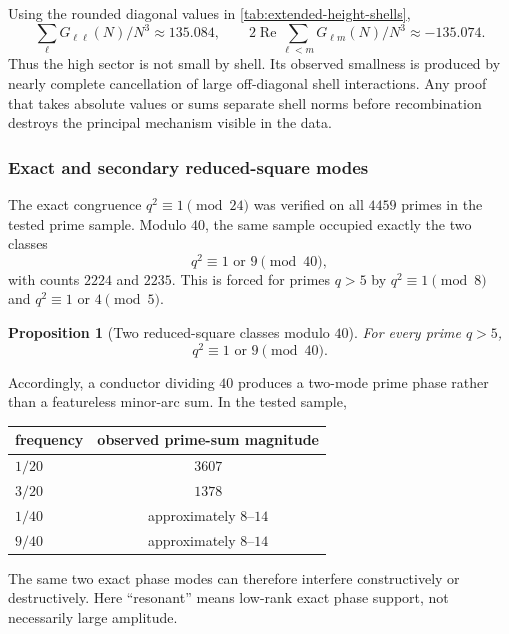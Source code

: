 \documentclass[11pt]{article}
\newtheorem{proposition}[theorem]{Proposition}
\theoremstyle{definition}
\newcommand{\1}{\mathbf{1}}
\newcommand{\Repart}{\operatorname{Re}}
\begin{document}
Using the rounded diagonal values in \cref{tab:extended-height-shells},
\begin{equation}
 \sum_\ell G_{\ell\ell}(N)/N^3\approx135.084,
 \qquad
 2\Repart\sum_{\ell<m}G_{\ell m}(N)/N^3\approx-135.074.
 \label{eq:extended-cross-shell-cancellation}
\end{equation}
Thus the high sector is not small by shell.  Its observed smallness is produced by nearly complete cancellation of large off-diagonal shell interactions.  Any proof that takes absolute values or sums separate shell norms before recombination destroys the principal mechanism visible in the data.

\subsubsection{Exact and secondary reduced-square modes}

The exact congruence $q^2\equiv1\pmod{24}$ was verified on all $4459$ primes in the tested prime sample.  Modulo $40$, the same sample occupied exactly the two classes
\begin{equation}
 q^2\equiv1\text{ or }9\pmod{40},
 \label{eq:prime-square-mod40}
\end{equation}
with counts $2224$ and $2235$.  This is forced for primes $q>5$ by $q^2\equiv1\pmod8$ and $q^2\equiv1$ or $4\pmod5$.

\begin{proposition}[Two reduced-square classes modulo $40$]
\label{prop:prime-square-mod40}
For every prime $q>5$,
\begin{equation}
 \boxed{q^2\equiv1\text{ or }9\pmod{40}.}
 \label{eq:prime-square-mod40-boxed}
\end{equation}
\end{proposition}

Accordingly, a conductor dividing $40$ produces a two-mode prime phase rather than a featureless minor-arc sum.  In the tested sample,
\begin{center}
\begin{tabular}{lc}
\toprule
frequency & observed prime-sum magnitude\\
\midrule
$1/20$ & $3607$\\
$3/20$ & $1378$\\
$1/40$ & approximately $8$--$14$\\
$9/40$ & approximately $8$--$14$\\
\bottomrule
\end{tabular}
\end{center}
The same two exact phase modes can therefore interfere constructively or destructively.  Here ``resonant'' means low-rank exact phase support, not necessarily large amplitude.
\end{document}

